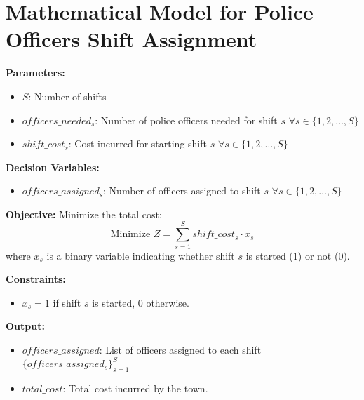 \documentclass{article}
\begin{document}
\section*{Mathematical Model for Police Officers Shift Assignment}

\textbf{Parameters:}
\begin{itemize}
    \item \( S \): Number of shifts
    \item \( officers\_needed_s \): Number of police officers needed for shift \( s \) \quad \(\forall s \in \{1, 2, \ldots, S\}\)
    \item \( shift\_cost_s \): Cost incurred for starting shift \( s \) \quad \(\forall s \in \{1, 2, \ldots, S\}\)
\end{itemize}

\textbf{Decision Variables:}
\begin{itemize}
    \item \( officers\_assigned_s \): Number of officers assigned to shift \( s \) \quad \(\forall s \in \{1, 2, \ldots, S\}\)
\end{itemize}

\textbf{Objective:}
Minimize the total cost:
\[
\text{Minimize } Z = \sum_{s=1}^{S} shift\_cost_s \cdot x_s
\]
where \( x_s \) is a binary variable indicating whether shift \( s \) is started (1) or not (0).

\textbf{Constraints:}
\]
\begin{itemize}
    \item \( x_s = 1 \) if shift \( s \) is started, \( 0 \) otherwise.
\end{itemize}

\textbf{Output:}
\begin{itemize}
    \item \( officers\_assigned \): List of officers assigned to each shift \(\{ officers\_assigned_s \}_{s=1}^S\)
    \item \( total\_cost \): Total cost incurred by the town.
\end{itemize}
\end{document}
